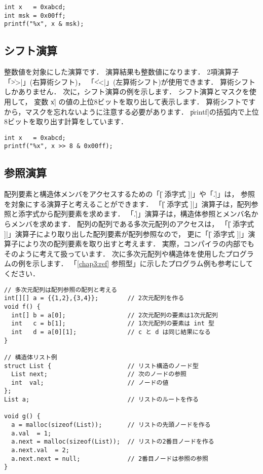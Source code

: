 \begin{mylist}
\begin{verbatim}
int x   = 0xabcd;
int msk = 0x00ff;
printf("%x", x & msk);
\end{verbatim}
\end{mylist}

\subsection{シフト演算}

整数値を対象にした演算です．
演算結果も整数値になります．
2項演算子
「\|>>|」(右算術シフト)，
「\|<<|」(左算術シフト)が使用できます．
算術シフトしかありません．
次に，シフト演算の例を示します．
シフト演算とマスクを使用して，
変数 \|x| の値の上位8ビットを取り出して表示します．
算術シフトですから，マスクを忘れないように注意する必要があります．
\|printf|の括弧内で上位8ビットを取り出す計算をしています．

\begin{mylist}
\begin{verbatim}
int x   = 0xabcd;
printf("%x", x >> 8 & 0x00ff);
\end{verbatim}
\end{mylist}

\subsection{参照演算}

配列要素と構造体メンバをアクセスするための「\|[ 添字式 ]|」や「\|.|」は，
参照を対象にする演算子と考えることができます．
「\|[ 添字式 ]|」演算子は，配列参照と添字式から配列要素を求めます．
「\|.|」演算子は，構造体参照とメンバ名からメンバを求めます．
配列の配列である多次元配列のアクセスは，
「\|[ 添字式 ]|」演算子により取り出した配列要素が配列参照なので，
更に「\|[ 添字式 ]|」演算子により次の配列要素を取り出すと考えます．
実際，\cmm コンパイラの内部でもそのように考えて扱っています．
次に多次元配列や構造体を使用したプログラムの例を示します．
「\ref{chap3:ref} 参照型」に示したプログラム例も参考にしてください．

\begin{mylist}
\begin{verbatim}
// 多次元配列は配列参照の配列と考える
int[][] a = {{1,2},{3,4}};        // 2次元配列を作る
void f() {
  int[] b = a[0];                 // 2次元配列の要素は1次元配列
  int   c = b[1];                 // 1次元配列の要素は int 型
  int   d = a[0][1];              // c と d は同じ結果になる
}

// 構造体リスト例
struct List {                     // リスト構造のノード型
  List next;                      // 次のノードの参照
  int  val;                       // ノードの値
};
List a;                           // リストのルートを作る

void g() {
  a = malloc(sizeof(List));       // リストの先頭ノードを作る
  a.val  = 1;
  a.next = malloc(sizeof(List));  // リストの2番目ノードを作る
  a.next.val  = 2;
  a.next.next = null;             // 2番目ノードは参照の参照
}
\end{verbatim}
\end{mylist}

